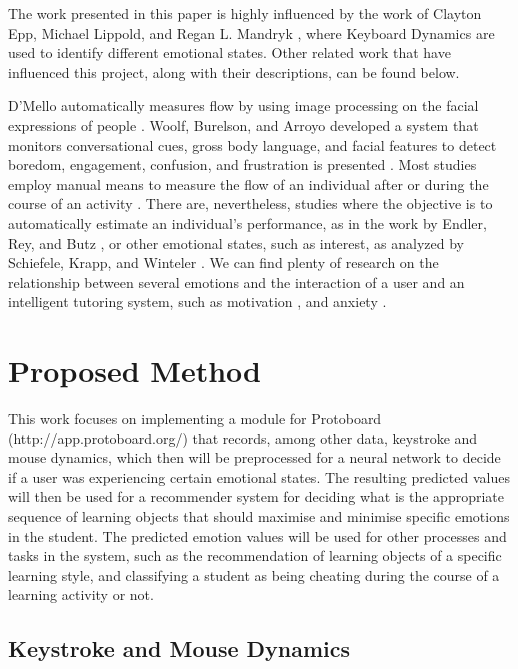 \documentclass{acm_proc_article-sp}
\begin{document}
The work presented in this paper is highly influenced by the work of
Clayton Epp, Michael Lippold, and Regan L. Mandryk
\cite{epp2011identifying}, where Keyboard Dynamics are used to
identify different emotional states. Other related work that have
influenced this project, along with their descriptions, can be found below.

D'Mello automatically measures flow by using image processing on the
facial expressions of people \cite{d2008autotutor}. Woolf, Burelson, and Arroyo
developed a system that monitors conversational cues, gross body
language, and facial features to detect boredom, engagement,
confusion, and frustration is presented \cite{woolf2007emotional}. Most studies employ
manual means to measure the flow of an individual after or during the
course of an activity \cite{lopez2011oxford}. There are, nevertheless, studies where the
objective is to automatically estimate an individual's performance, as
in the work by Endler, Rey, and Butz \cite{endler2012towards}, or other emotional states,
such as interest, as analyzed by Schiefele, Krapp, and Winteler
\cite{schiefele1992interest}. We can find plenty of research on the relationship between
several emotions and the interaction of a user and an intelligent
tutoring system, such as motivation \cite{astleitneraptitude},
\cite{carletta1996assessing} and anxiety \cite{keeley2008curvilinear}.



\section{Proposed Method}
\label{proposed-method}

This work focuses on implementing a module for Protoboard (http://app.protoboard.org/) that
records, among other data, keystroke and mouse dynamics, which then
will be preprocessed for a neural network to decide if a user was
experiencing certain emotional states. The resulting predicted values
will then be used for a recommender system for deciding what is the
appropriate sequence of learning objects that should maximise and
minimise specific emotions in the student. The predicted emotion
values will be used for other processes and tasks in the system, such
as the recommendation of learning objects of a specific learning
style, and classifying a student as being cheating during the course
of a learning activity or not.


\subsection{Keystroke and Mouse Dynamics}
\end{document}
